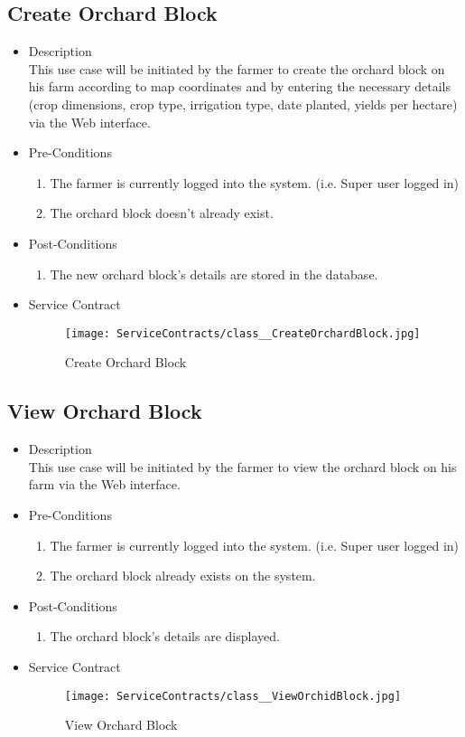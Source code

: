 \documentclass[11pt,fleqn]{book} %
\begin{document}
\subsection{Create Orchard Block}
\begin{itemize}
	\item Description\\
	This use case will be initiated by the farmer to create the orchard block on his farm according to map coordinates and by entering the necessary details (crop dimensions, crop type, irrigation type, date planted, yields per hectare) via the Web interface.
	\item Pre-Conditions
	\begin{enumerate}
		\item The farmer is currently logged into the system. (i.e. Super user logged in)
		\item The orchard block doesn't already exist.
	\end{enumerate}
	\item Post-Conditions
	\begin{enumerate}
		\item The new orchard block’s details are stored in the database.		
	\end{enumerate}
	\item Service Contract
	\begin{figure}
		\texttt{[image: ServiceContracts/class\_\_CreateOrchardBlock.jpg]}
		\caption{Create Orchard Block}
	\end{figure}
\end{itemize}

\subsection{View Orchard Block}
\begin{itemize}
	\item Description\\
	This use case will be initiated by the farmer to view the orchard block on his farm via the Web interface.
	\item Pre-Conditions
	\begin{enumerate}
		\item The farmer is currently logged into the system. (i.e. Super user logged in)
		\item The orchard block already exists on the system.					
	\end{enumerate}
	\item Post-Conditions
	\begin{enumerate}
		\item The orchard block’s details are displayed.
	\end{enumerate}
	\item Service Contract
	\begin{figure}
		\texttt{[image: ServiceContracts/class\_\_ViewOrchidBlock.jpg]}
		\caption{View Orchard Block}
	\end{figure}
\end{itemize}
\end{document}
